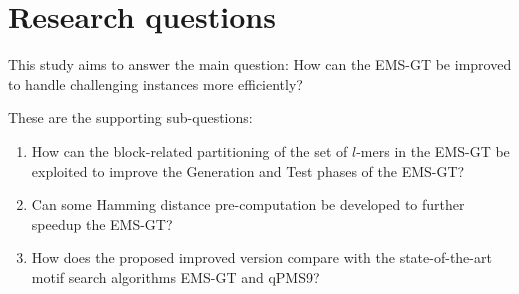 \section{Research questions}

This study aims to answer the main question: How can the EMS-GT be improved to handle challenging instances more efficiently?

These are the supporting sub-questions:

\begin{enumerate}
	\item How can the block-related partitioning of the set of $l$-mers in the EMS-GT be exploited to improve the Generation and Test phases of the EMS-GT?

	\item Can some Hamming distance pre-computation be developed to further speedup the EMS-GT?

	\item How does the proposed improved version compare with the state-of-the-art motif search algorithms EMS-GT and qPMS9?


\end{enumerate}